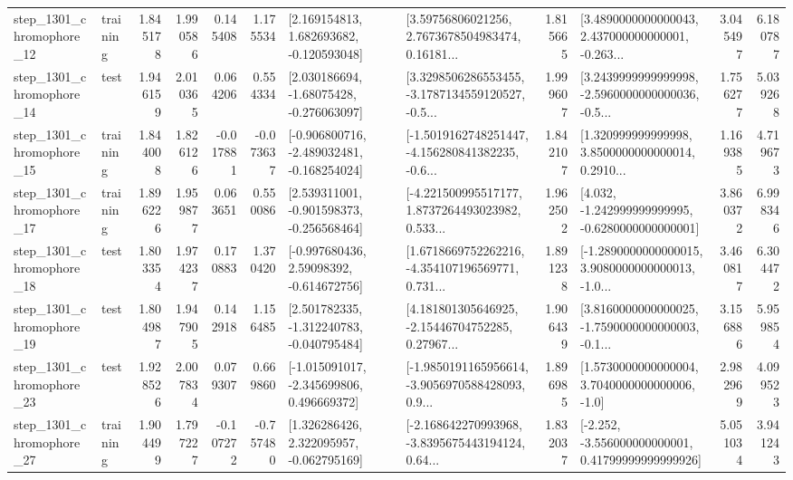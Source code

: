 \begin{tabular}{llrrrrllrlrr}
 step\_1301\_chromophore\_12 &  training &      1.845178 &    1.990586 &      0.145408 &  1.175534 &    [2.169154813, 1.682693682, -0.120593048] &  [3.59756806021256, 2.7673678504983474, 0.16181... &       1.815665 &  [3.4890000000000043, 2.437000000000001, -0.263... &            3.045497 &          6.180787 \\
 step\_1301\_chromophore\_14 &      test &      1.946159 &    2.010365 &      0.064206 &  0.554334 &    [2.030186694, -1.68075428, -0.276063097] &  [3.3298506286553455, -3.1787134559120527, -0.5... &       1.999607 &  [3.2439999999999998, -2.5960000000000036, -0.5... &            1.756277 &          5.039268 \\
 step\_1301\_chromophore\_15 &  training &      1.844008 &    1.826126 &     -0.017881 & -0.073637 &  [-0.906800716, -2.489032481, -0.168254024] &  [-1.5019162748251447, -4.156280841382235, -0.6... &       1.842107 &  [1.320999999999998, 3.8500000000000014, 0.2910... &            1.169385 &          4.719673 \\
 step\_1301\_chromophore\_17 &  training &      1.896226 &    1.959877 &      0.063651 &  0.550086 &   [2.539311001, -0.901598373, -0.256568464] &  [-4.221500995517177, 1.8737264493023982, 0.533... &       1.962502 &   [4.032, -1.242999999999995, -0.6280000000000001] &            3.860372 &          6.998346 \\
 step\_1301\_chromophore\_18 &      test &      1.803354 &    1.974237 &      0.170883 &  1.370420 &    [-0.997680436, 2.59098392, -0.614672756] &  [1.6718669752262216, -4.354107196569771, 0.731... &       1.891238 &  [-1.2890000000000015, 3.9080000000000013, -1.0... &            3.460817 &          6.304472 \\
 step\_1301\_chromophore\_19 &      test &      1.804987 &    1.947905 &      0.142918 &  1.156485 &   [2.501782335, -1.312240783, -0.040795484] &  [4.181801305646925, -2.15446704752285, 0.27967... &       1.906439 &  [3.8160000000000025, -1.7590000000000003, -0.1... &            3.156886 &          5.959854 \\
 step\_1301\_chromophore\_23 &      test &      1.928526 &    2.007834 &      0.079307 &  0.669860 &   [-1.015091017, -2.345699806, 0.496669372] &  [-1.9850191165956614, -3.9056970588428093, 0.9... &       1.896985 &     [1.5730000000000004, 3.7040000000000006, -1.0] &            2.982969 &          4.099523 \\
 step\_1301\_chromophore\_27 &  training &      1.904499 &    1.797227 &     -0.107272 & -0.757480 &    [1.326286426, 2.322095957, -0.062795169] &  [-2.168642270993968, -3.8395675443194124, 0.64... &       1.832037 &  [-2.252, -3.556000000000001, 0.41799999999999926] &            5.051034 &          3.941243 \\

\end{tabular}
